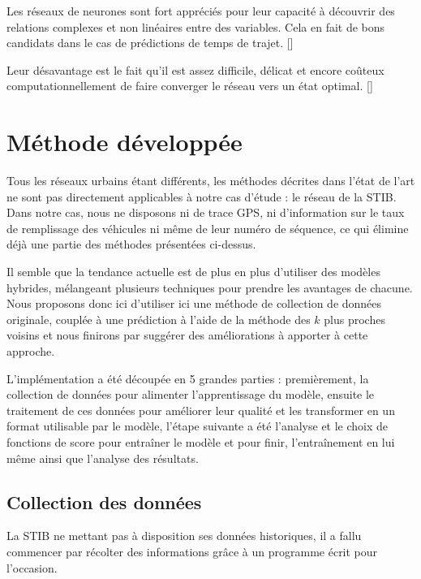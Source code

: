 \documentclass[letterpaper]{article}
\begin{document}
Les réseaux de neurones sont fort appréciés pour leur capacité à découvrir des relations complexes et non linéaires entre des variables. Cela en fait de bons candidats dans le cas de prédictions de temps de trajet. [\cite{Chen2004}]

Leur désavantage est le fait qu'il est assez difficile, délicat et encore coûteux computationnellement de faire converger le réseau vers un état optimal. [\cite{Altinkaya2013}]


\section{Méthode développée}

Tous les réseaux urbains étant différents, les méthodes décrites dans l'état de l'art ne sont pas directement applicables à notre cas d'étude : le réseau de la STIB. Dans notre cas, nous ne disposons ni de trace GPS, ni d'information sur le taux de remplissage des véhicules ni même de leur numéro de séquence, ce qui élimine déjà une partie des méthodes présentées ci-dessus.

Il semble que la tendance actuelle est de plus en plus d'utiliser des modèles hybrides, mélangeant plusieurs techniques pour prendre les avantages de chacune. Nous proposons donc ici d'utiliser ici une méthode de collection de données originale, couplée à une prédiction à l'aide de la méthode des $k$ plus proches voisins et nous finirons par suggérer des améliorations à apporter à cette approche.

L'implémentation a été découpée en 5 grandes parties : premièrement, la collection de données pour alimenter l'apprentissage du modèle, ensuite le traitement de ces données pour améliorer leur qualité et les transformer en un format utilisable par le modèle, l'étape suivante a été l'analyse et le choix de fonctions de score pour entraîner le modèle et pour finir, l’entraînement en lui même ainsi que l'analyse des résultats.

\subsection{Collection des données}

La STIB ne mettant pas à disposition ses données historiques, il a fallu commencer par récolter des informations grâce à un programme écrit pour l'occasion.
\end{document}
